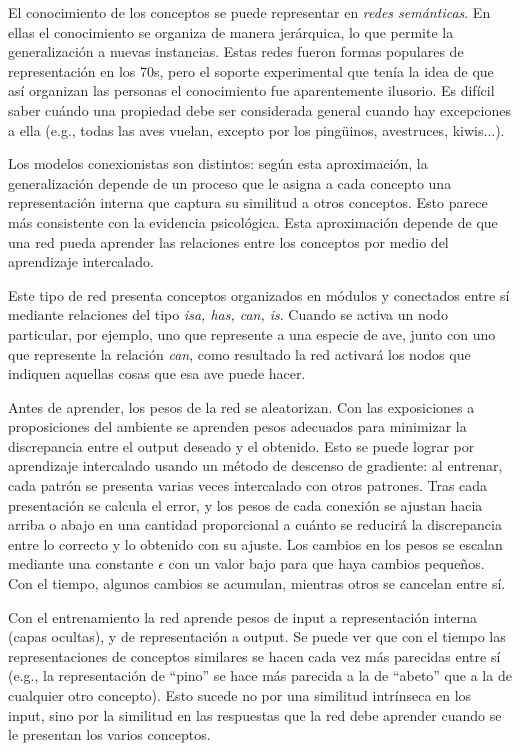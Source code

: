 \documentclass[a4paper,12pt]{article}
\begin{document}
El conocimiento de los conceptos se puede representar en {\itshape redes semánticas}. En ellas el conocimiento se organiza de manera jerárquica, lo que permite la generalización a nuevas instancias. Estas redes fueron formas populares de representación en los 70s, pero el soporte experimental que tenía la idea de que así organizan las personas el conocimiento fue aparentemente ilusorio. Es difícil saber cuándo una propiedad debe ser considerada general cuando hay excepciones a ella (e.g., todas las aves vuelan, excepto por los pingüinos, avestruces, kiwis...). 

Los modelos conexionistas son distintos: según esta aproximación, la generalización depende de un proceso que le asigna a cada concepto una representación interna que captura su similitud a otros conceptos. Esto parece más consistente con la evidencia psicológica. Esta aproximación depende de que una red pueda aprender las relaciones entre los conceptos por medio del aprendizaje intercalado. 

Este tipo de red presenta conceptos organizados en módulos y conectados entre sí mediante relaciones del tipo {\itshape isa, has, can, is}. Cuando se activa un nodo particular, por ejemplo, uno que represente a una especie de ave, junto con uno que represente la relación {\itshape can}, como resultado la red activará los nodos que indiquen aquellas cosas que esa ave puede hacer.

Antes de aprender, los pesos de la red se aleatorizan. Con las exposiciones a proposiciones del ambiente se aprenden pesos adecuados para minimizar la discrepancia entre el output deseado y el obtenido. Esto se puede lograr por aprendizaje intercalado usando un método de descenso de gradiente: al entrenar, cada patrón se presenta varias veces intercalado con otros patrones. Tras cada presentación se calcula el error, y los pesos de cada conexión se ajustan hacia arriba o abajo en una cantidad proporcional a cuánto se reducirá la discrepancia entre lo correcto y lo obtenido con su ajuste. Los cambios en los pesos se escalan mediante una constante $\epsilon$ con un valor bajo para que haya cambios pequeños. Con el tiempo, algunos cambios se acumulan, mientras otros se cancelan entre sí.

Con el entrenamiento la red aprende pesos de input a representación interna (capas ocultas), y de representación a output. Se puede ver que con el tiempo las representaciones de conceptos similares se hacen cada vez más parecidas entre sí (e.g., la representación de ``pino'' se hace más parecida a la de ``abeto'' que a la de cualquier otro concepto). Esto sucede no por una similitud intrínseca en los input, sino por la similitud en las respuestas que la red debe aprender cuando se le presentan los varios conceptos.
\end{document}
